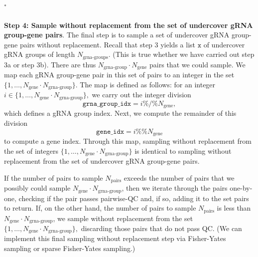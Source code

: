\documentclass[12pt]{article}
\begin{document}
$^*$  
\\ \\
\textbf{Step 4: Sample without replacement from the set of undercover gRNA group-gene pairs}. The final step is to sample a set of undercover gRNA group-gene pairs without replacement. Recall that step 3 yields a list $\texttt{x}$ of undercover gRNA groups of length $N_\textrm{grna-groups}$. (This is true whether we have carried out step 3a or step 3b). There are thus $N_\textrm{grna-group} \cdot N_\textrm{gene}$ pairs that we could sample. We map each gRNA group-gene pair in this set of pairs to an integer in the set $\{1, \dots, N_\textrm{gene} \cdot N_\textrm{grna-group} \}.$ The map is defined as follows: for an integer $i \in \{1, \dots, N_\textrm{gene} \cdot N_\textrm{grna-group}\},$ we carry out the integer division $$ \texttt{grna\_group\_idx} = i \%/\% N_\textrm{gene},$$ which defines a gRNA group index. Next, we compute the remainder of this division
$$ \texttt{gene\_idx} = i \%\% N_\textrm{gene}$$ to compute a gene index. Through this map, sampling without replacement from the set of integers $\{1, \dots, N_\textrm{gene} \cdot N_\textrm{grna-group}\}$ is identical to sampling without replacement from the set of undercover gRNA group-gene pairs.

If the number of pairs to sample $N_\textrm{pairs}$ exceeds the number of pairs that we possibly could sample $ N_\textrm{gene} \cdot N_\textrm{grna-group}$, then we iterate through the pairs one-by-one, checking if the pair passes pairwise-QC and, if so, adding it to the set pairs to return. If, on the other hand, the number of pairs to sample $N_\textrm{pairs}$ is less than $N_\textrm{gene} \cdot N_\textrm{grna-group}$, we sample without replacement from the set $\{ 1, \dots, N_\textrm{gene} \cdot N_\textrm{grna-group} \},$ discarding those pairs that do not pass QC. (We can implement this final sampling without replacement step via Fisher-Yates sampling or sparse Fisher-Yates sampling.)




\end{document}
